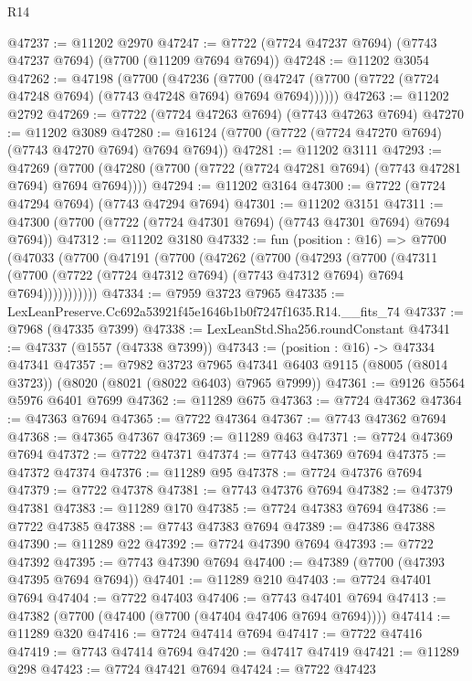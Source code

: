 \begin{lexlean}{R14}
\begin{coremodule}
@47237 := @11202 @2970
@47247 := @7722 (@7724 @47237 @7694) (@7743 @47237 @7694) (@7700 (@11209 @7694 @7694))
@47248 := @11202 @3054
@47262 := @47198
    (@7700
      (@47236
        (@7700 (@47247 (@7700 (@7722 (@7724 @47248 @7694) (@7743 @47248 @7694) @7694 @7694))))))
@47263 := @11202 @2792
@47269 := @7722 (@7724 @47263 @7694) (@7743 @47263 @7694)
@47270 := @11202 @3089
@47280 := @16124 (@7700 (@7722 (@7724 @47270 @7694) (@7743 @47270 @7694) @7694 @7694))
@47281 := @11202 @3111
@47293 := @47269
    (@7700 (@47280 (@7700 (@7722 (@7724 @47281 @7694) (@7743 @47281 @7694) @7694 @7694))))
@47294 := @11202 @3164
@47300 := @7722 (@7724 @47294 @7694) (@7743 @47294 @7694)
@47301 := @11202 @3151
@47311 := @47300 (@7700 (@7722 (@7724 @47301 @7694) (@7743 @47301 @7694) @7694 @7694))
@47312 := @11202 @3180
@47332 := fun (position : @16) =>
  @7700
    (@47033
      (@7700
        (@47191
          (@7700
            (@47262
              (@7700
                (@47293
                  (@7700
                    (@47311
                      (@7700 (@7722 (@7724 @47312 @7694) (@7743 @47312 @7694) @7694 @7694)))))))))))
@47334 := @7959 @3723 @7965
@47335 := LexLeanPreserve.Cc692a53921f45e1646b1b0f7247f1635.R14.__fits_74
@47337 := @7968 (@47335 @7399)
@47338 := LexLeanStd.Sha256.roundConstant
@47341 := @47337 (@1557 (@47338 @7399))
@47343 := (position : @16) -> @47334 @47341
@47357 := @7982
    @3723
    @7965
    @47341
    @6403
    @9115
    (@8005 (@8014 @3723))
    (@8020 (@8021 (@8022 @6403) @7965 @7999))
@47361 := @9126 @5564 @5976 @6401 @7699
@47362 := @11289 @675
@47363 := @7724 @47362
@47364 := @47363 @7694
@47365 := @7722 @47364
@47367 := @7743 @47362 @7694
@47368 := @47365 @47367
@47369 := @11289 @463
@47371 := @7724 @47369 @7694
@47372 := @7722 @47371
@47374 := @7743 @47369 @7694
@47375 := @47372 @47374
@47376 := @11289 @95
@47378 := @7724 @47376 @7694
@47379 := @7722 @47378
@47381 := @7743 @47376 @7694
@47382 := @47379 @47381
@47383 := @11289 @170
@47385 := @7724 @47383 @7694
@47386 := @7722 @47385
@47388 := @7743 @47383 @7694
@47389 := @47386 @47388
@47390 := @11289 @22
@47392 := @7724 @47390 @7694
@47393 := @7722 @47392
@47395 := @7743 @47390 @7694
@47400 := @47389 (@7700 (@47393 @47395 @7694 @7694))
@47401 := @11289 @210
@47403 := @7724 @47401 @7694
@47404 := @7722 @47403
@47406 := @7743 @47401 @7694
@47413 := @47382 (@7700 (@47400 (@7700 (@47404 @47406 @7694 @7694))))
@47414 := @11289 @320
@47416 := @7724 @47414 @7694
@47417 := @7722 @47416
@47419 := @7743 @47414 @7694
@47420 := @47417 @47419
@47421 := @11289 @298
@47423 := @7724 @47421 @7694
@47424 := @7722 @47423

\end{coremodule}
\end{lexlean}
